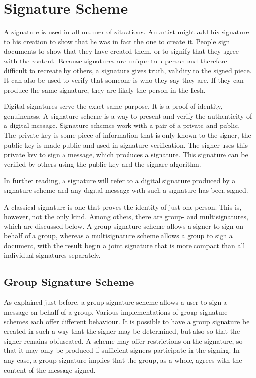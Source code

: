 \documentclass[12pt]{report}
\theoremstyle{plain}
\theoremstyle{definition}
\begin{document}
	\section{Signature Scheme}
	A signature is used in all manner of situations. An artist might add his signature to his creation to show that he was in fact the one to create it. People sign documents to show that they have created them, or to signify that they agree with the content. Because signatures are unique to a person and therefore difficult to recreate by others, a signature gives truth, validity to the signed piece. It can also be used to verify that someone is who they say they are. If they can produce the same signature, they are likely the person in the flesh.
	
	Digital signatures serve the exact same purpose. It is a proof of identity, genuineness. A signature scheme is a way to present and verify the authenticity of a digital message. Signature schemes work with a pair of a private and public. The private key is some piece of information that is only known to the signer, the public key is made public and used in signature verification. The signer uses this private key to sign a message, which produces a signature. This signature can be verified by others using the public key and the signare algorithm.
	
	In further reading, a signature will refer to a digital signature produced by a signature scheme and any digital message with such a signature has been signed.
	
	A classical signature is one that proves the identity of just one person. This is, however, not the only kind. Among others, there are group- and multisignatures, which are discussed below. A group signature scheme allows a signer to sign on behalf of a group, whereas a multisignature scheme allows a group to sign a document, with the result begin a joint signature that is more compact than all individual signatures separately.
	
	\subsection{Group Signature Scheme}
	As explained just before, a group signature scheme allows a user to sign a message on behalf of a group. Various implementations of group signature schemes each offer different behaviour. It is possible to have a group signature be created in such a way that the signer may be determined, but also so that the signer remains obfuscated. A scheme may offer restrictions on the signature, so that it may only be produced if sufficient signers participate in the signing. In any case, a group signature implies that the group, as a whole, agrees with the content of the message signed.
	
\end{document}
